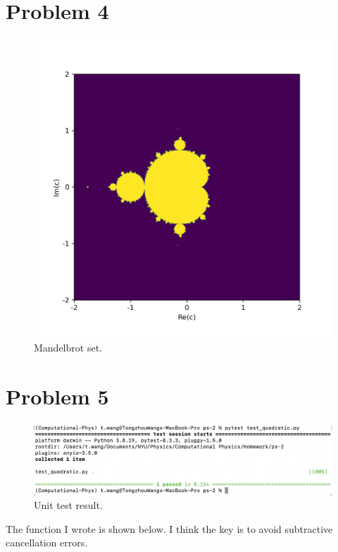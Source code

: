 \documentclass[11pt]{article}
\begin{document}
\section{Problem 4}
\begin{figure}[H]
    \centering
    \includegraphics[scale = 0.8]{images/Mandelbrot-set.png}
    \caption{Mandelbrot set.}
\end{figure}

\section{Problem 5}
\begin{figure}[H]
    \centering
    \includegraphics[scale = 0.6]{images/ps-2-5_test-result.png}
    \caption{Unit test result.}
\end{figure}

The function I wrote is shown below. I think the key is to avoid subtractive cancellation errors.
\end{document}

